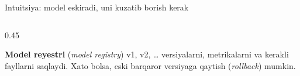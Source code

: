 \documentclass[aspectratio=169,11pt]{beamer}
\newcommand{\uzq}{\textquotesingle{}}   %
\begin{document}
\begin{frame}{Intuitsiya: model eskiradi, uni kuzatib borish kerak}
\begin{columns}[T,totalwidth=\textwidth]
\begin{column}{0.45\textwidth}
      \vspace{4pt}

      \begin{tcolorbox}[okbox,top=2pt,bottom=2pt]
        \footnotesize
        \textbf{Model reyestri} (\textit{model registry}) v1, v2, \dots
        versiyalarni, metrikalarni va kerakli fayllarni saqlaydi.
        Xato bo\uzq{}lsa, eski barqaror versiyaga qaytish
        (\textit{rollback}) mumkin.
      \end{tcolorbox}
    \end{column}
  \end{columns}
\end{frame}

\end{document}
